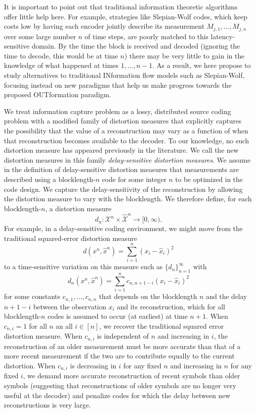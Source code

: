 \documentclass[12pt,letterpaper]{article}
\begin{document}
It is important to point out that traditional information theoretic algorithms offer little help here. For example, strategies like Slepian-Wolf codes, which keep costs low by having each encoder jointly describe its measurement $M_{j,1},\dots,M_{j,n}$ over some large number $n$ of time steps, are poorly matched to this latency-sensitive domain. By the time the block is received and decoded (ignoring the time to decode, this would be at time $n$) there may be very little to gain in the knowledge of what happened at times $1,\ldots,n-1$.  As a result, we here propose to study alternatives to traditional INformation flow models such as Slepian-Wolf, focusing instead on new paradigms that help us make progress towards the proposed  OUTformation paradigm.   

We treat information capture problem as a lossy, distributed source coding problem with a modified family of distortion measures that explicitly captures the possibility that the value of a reconstruction may vary as a function of when that reconstruction becomes available to the decoder.  To our knowledge, no such distortion measure has appeared previously in the literature.  We call the new distortion measures in this family {\em delay-sensitive distortion measures}.  We assume in the definition of delay-sensitive distortion measures that measurements are described using a blocklength-$n$ code for some integer $n$ to be optimized in the code design.  We capture the delay-sensitivity of the reconstruction by allowing the distortion measure to vary with the blocklength.  We therefore define, for each blocklength-$n$, a distortion measure 
\begin{equation}
d_n \colon \mathcal {X}^n \times \hat{\mathcal{X}}^n \rightarrow [0,\infty).
\end{equation}
For example, in a delay-sensitive coding environment, we might move from the traditional squared-error distortion measure 
\begin{equation}
d(x^n,\hat{x}^n)=\sum_{i=1}^n (x_i-\hat{x}_i)^2
\end{equation}
to a time-sensitive variation on this measure such as $\{d_n\}_{n=1}^\infty$ with 
\begin{equation}
d_n(x^n,\hat{x}^n)=\sum_{i=1}^n c_{n,n+1-i}(x_i-\hat{x}_i)^2
\end{equation}
for some constants $c_{n,1},\ldots,c_{n,n}$ that depends on the blocklength $n$ and the delay $n+1-i$ between the observation $x_i$ and its reconstruction, which for all blocklength-$n$ codes is assumed to occur (at earliest) at time $n+1$.  When $c_{n,i}=1$ for all $n$ an all $i\in[n]$, we recover the traditional squared error distortion measure.  When $c_{n,i}$ is independent of $n$ and increasing in $i$, the reconstruction of an older measurement must be more accurate than that of a more recent measurement if the two are to contribute equally to the current distortion.  When $c_{n,i}$ is decreasing in $i$ for any fixed $n$ and increasing in $n$ for any fixed $i$, we demand more accurate reconstruction of recent symbols than older symbols (suggesting that reconstructions of older symbols are no longer very useful at the decoder) and penalize codes for which the delay between new reconstructions is very large. 
 
\end{document}
